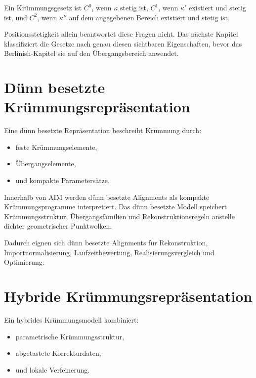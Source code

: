 \begin{definition}[Krümmungsstetigkeit]
\label{def:curvature-continuity}
Ein Krümmungsgesetz ist $C^0$, wenn $\kappa$ stetig ist, $C^1$, wenn
$\kappa'$ existiert und stetig ist, und $C^2$, wenn $\kappa''$ auf dem
angegebenen Bereich existiert und stetig ist.
\end{definition}

Positionsstetigkeit allein beantwortet diese Fragen nicht. Das nächste Kapitel
klassifiziert die Gesetze nach genau diesen sichtbaren Eigenschaften, bevor
das Berlinish-Kapitel sie auf den Übergangsbereich anwendet.

\section{Dünn besetzte Krümmungsrepräsentation}

\begin{definition}
\label{def:sparse-curvature-representation}
Eine dünn besetzte Repräsentation beschreibt Krümmung durch:
\begin{itemize}
\item feste Krümmungselemente,
\item Übergangselemente,
\item und kompakte Parametersätze.
\end{itemize}
\end{definition}

Innerhalb von AIM werden dünn besetzte Alignments als kompakte
Krümmungsprogramme interpretiert. Das dünn besetzte Modell speichert
Krümmungsstruktur, Übergangsfamilien und Rekonstruktionsregeln anstelle dichter
geometrischer Punktwolken.

Dadurch eignen sich dünn besetzte Alignments für Rekonstruktion,
Importnormalisierung, Laufzeitbewertung, Realisierungsvergleich und
Optimierung.

\section{Hybride Krümmungsrepräsentation}

\begin{definition}
\label{def:hybrid-curvature-model}
Ein hybrides Krümmungsmodell kombiniert:
\begin{itemize}
\item parametrische Krümmungsstruktur,
\item abgetastete Korrekturdaten,
\item und lokale Verfeinerung.
\end{itemize}
\end{definition}

